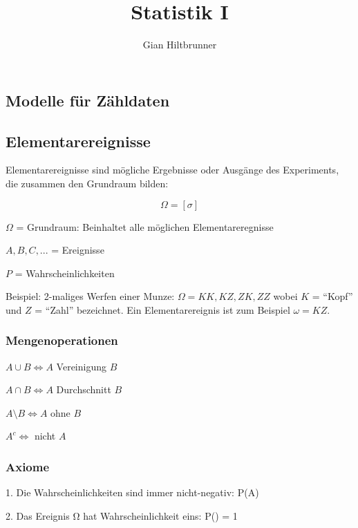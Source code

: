 \documentclass{article}
\begin{document}
\begin{multicols*}{3}


\title{Statistik I}
\author{Gian Hiltbrunner}
\maketitle


\section{Modelle für Zähldaten}
    \subsection{Elementarereignisse}

      Elementarereignisse sind mögliche Ergebnisse oder Ausgänge des Experiments,
      die zusammen den Grundraum bilden:

      $$\Omega =[\sigma]$$

      $\Omega$ = Grundraum: Beinhaltet alle möglichen Elementareregnisse

      $A, B, C,...$ = Ereignisse

      $P$ = Wahrscheinlichkeiten
      \par
      Beispiel: 2-maliges Werfen einer Munze:
      $\Omega = {KK, KZ, ZK, ZZ}$ wobei $K$ = “Kopf” und $Z$ = “Zahl” bezeichnet. Ein
      Elementarereignis ist zum Beispiel $\omega = KZ$.

      \subsubsection{Mengenoperationen}
      $A \cup B \Longleftrightarrow A$ Vereinigung $B$

      $A \cap B \Longleftrightarrow A$ Durchschnitt $B$

      $A \setminus B \Longleftrightarrow A$ ohne $B$

      $A^c \Longleftrightarrow$ nicht $A$

    \subsubsection{Axiome}

      1. Die Wahrscheinlichkeiten sind immer nicht-negativ: P(A) 

      2. Das Ereignis Ω hat Wahrscheinlichkeit eins: P(\Omega) = 1


\end{multicols*}
\end{document}
